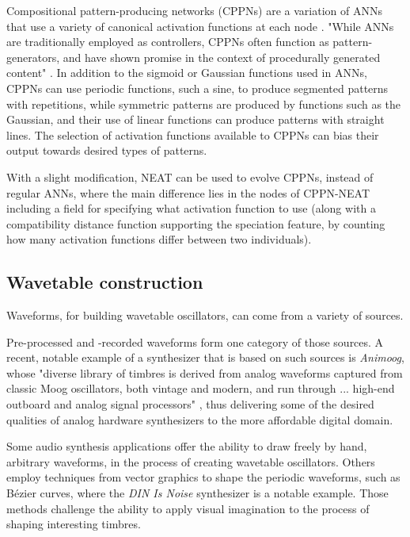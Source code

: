 \documentclass[conference]{IEEEtran}
\begin{document}
Compositional pattern-producing networks (CPPNs) are a variation of ANNs that use a variety of canonical activation functions at each node \cite{stanley2007compositional}.  "While ANNs are traditionally employed as controllers, CPPNs often function as pattern-generators, and have shown promise in the context of procedurally generated content" \cite{DBLP:journals/corr/RisiT14}.  In addition to the sigmoid or Gaussian functions used in ANNs, CPPNs can use periodic functions, such a sine, to produce segmented patterns with repetitions, while symmetric patterns are produced by functions such as the Gaussian, and their use of linear functions can produce patterns with straight lines.  The selection of activation functions available to CPPNs can bias their output towards desired types of patterns.

With a slight modification, NEAT can be used to evolve CPPNs, instead of regular ANNs, where the main difference lies in the nodes of CPPN-NEAT including a field for specifying what activation function to use (along with a compatibility distance function supporting the speciation feature, by counting how many activation functions differ between two individuals).


\subsection{Wavetable construction}

Waveforms, for building wavetable oscillators, can come from a variety of sources.  

Pre-processed and -recorded waveforms form one category of those sources.  A recent, notable example of a synthesizer that is based on such sources is \textit{Animoog}, whose "diverse library of timbres is derived from analog waveforms captured from classic Moog oscillators, both vintage and modern, and run through ... high-end outboard and analog signal processors" \cite{Animoog}, thus delivering some of the desired qualities of analog hardware synthesizers to the more affordable digital domain.

Some audio synthesis applications offer the ability to draw freely by hand, arbitrary waveforms, in the process of creating wavetable oscillators.  Others employ techniques from vector graphics to shape the periodic waveforms, such as Bézier curves, where the \textit{DIN Is Noise} synthesizer \cite{DIN} is a notable example.  Those methods challenge the ability to apply visual imagination to the process of shaping interesting timbres.
\end{document}
